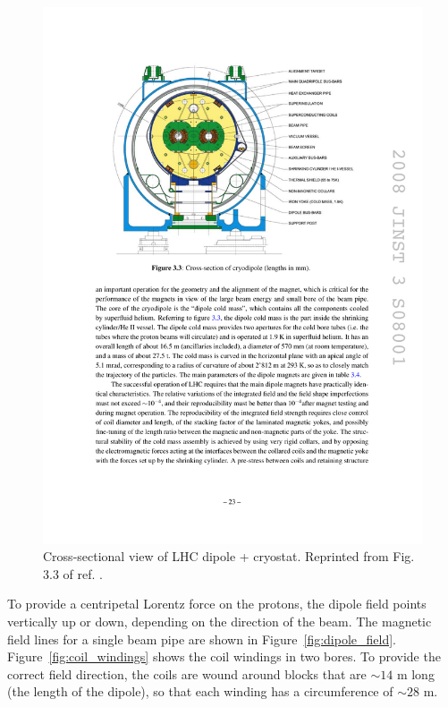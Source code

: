 \documentclass[dissertation.tex]{subfiles}
\begin{document}
\begin{figure}
	\centering
	\includegraphics[scale=1.0]{LHC_dipole_cross_section}
	\caption{Cross-sectional view of LHC dipole + cryostat.  Reprinted from Fig. 3.3 of ref. \cite{1748-0221-3-08-S08001}.}
	\label{fig:LHC_dipole_cross_section}
\end{figure}

To provide a centripetal Lorentz force on the protons, the dipole field points vertically up or down, depending on the direction of the beam.  The magnetic field lines for a single beam pipe are shown in Figure~\ref{fig:dipole_field}.  Figure~\ref{fig:coil_windings} shows the coil windings in two bores.  To provide the correct field direction, the coils are wound around blocks that are $\sim14$ m long (the length of the dipole), so that each winding has a circumference of $\sim28$ m.
\end{document}
